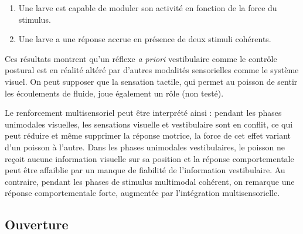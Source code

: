 \begin{enumerate}
    \item Une larve est capable de moduler son activité en fonction de la force du stimulus.
    \item Une larve a une réponse accrue en présence de deux stimuli cohérents.
\end{enumerate}

Ces résultats montrent qu'un réflexe \emph{a priori} vestibulaire comme le contrôle postural est en réalité altéré par d'autres modalités sensorielles comme le système visuel. On peut supposer que la sensation tactile, qui permet au poisson de sentir les écoulements de fluide, joue également un rôle (non testé). 

Le renforcement multisensoriel peut être interprété ainsi : pendant les phases unimodales visuelles, les sensations visuelle et vestibulaire sont en conflit, ce qui peut réduire et même supprimer la réponse motrice, la force de cet effet variant d'un poisson à l'autre. Dans les phases unimodales vestibulaires, le poisson ne reçoit aucune information visuelle sur sa position et la réponse comportementale peut être affaiblie par un manque de fiabilité de l'information vestibulaire. Au contraire, pendant les phases de stimulus multimodal cohérent, on remarque une réponse comportementale forte, augmentée par l'intégration multisensorielle.


\subsection{Ouverture}

